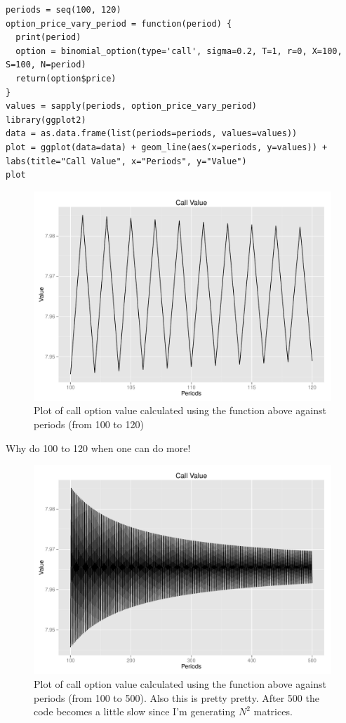 \documentclass[11pt]{scrartcl}
\begin{document}
\begin{lstlisting}
periods = seq(100, 120)
option_price_vary_period = function(period) {
  print(period)
  option = binomial_option(type='call', sigma=0.2, T=1, r=0, X=100, S=100, N=period)
  return(option$price)
}
values = sapply(periods, option_price_vary_period)
library(ggplot2)
data = as.data.frame(list(periods=periods, values=values))
plot = ggplot(data=data) + geom_line(aes(x=periods, y=values)) + labs(title="Call Value", x="Periods", y="Value")
plot
\end{lstlisting}

\begin{figure}[H]
\centering\includegraphics[width=\textwidth]{./hw6/problem3-120.pdf}
\caption{Plot of call option value calculated using the function above against periods (from 100 to 120)}
\end{figure}

Why do 100 to 120 when one can do more!

\begin{figure}[H]
\centering\includegraphics[width=\textwidth]{./hw6/problem3-500.pdf}
\caption{Plot of call option value calculated using the function above against periods (from 100 to 500). Also this is pretty pretty. After 500 the code becomes a little slow since I'm generating $N^2$ matrices.}
\end{figure}
\end{document}
